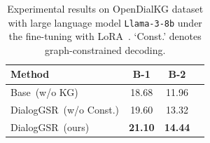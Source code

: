 
\begin{table}
\centering

    \small
    \begin{tabular}{l|ccc}
        \toprule
        {Method} &  B-1 & B-2  \\
         \midrule 
         \midrule
         Base~(w/o KG) & 18.68 & 11.96 \\
         DialogGSR~(w/o Const.) & 19.60 & 13.32 \\
         DialogGSR~(ours) & \textbf{21.10} & \textbf{14.44} \\
        \bottomrule
    \end{tabular}
    \caption{Experimental results on OpenDialKG dataset with large language model \texttt{Llama-3-8b} under the fine-tuning with LoRA~{\cite{hu2022lora}}. `Const.' denotes graph-constrained decoding.
}
\label{tab:llm}

\end{table}